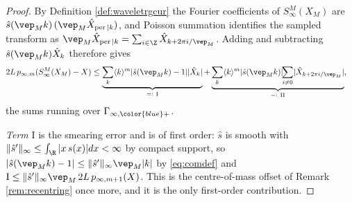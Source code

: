 \documentclass[a4paper, 11pt]{article}
\DeclareMathOperator{\1}{\mathds{1}}
\DeclareMathOperator{\per}{per}
\begin{document}
\begin{proof}
By Definition \ref{def:waveletrgcur} the Fourier coefficients of $S^{M}_{\infty}(X_{M})$ are $\hat{s}(\vep_{M}k)\!\ (\vep_{M}\hat{X}_{\per|k})$, and Poisson summation identifies the sampled transform as $\vep_{M}\hat{X}_{\per|k} = \sum_{i\in\Z}\hat{X}_{k+2\pi i/\vep_{M}}$. Adding and subtracting $\hat{s}(\vep_{M}k)\hat{X}_{k}$ therefore gives
\begin{align*}
2L\!\ p_{\infty,m}(S^{M}_{\infty}(X_{M})-X) & \leq \underbrace{\sum_{k}\langle k\rangle^{m}|\hat{s}(\vep_{M}k)-1||\hat{X}_{k}|}_{=:\ \mathrm{I}}+\underbrace{\sum_{k}\langle k\rangle^{m}|\hat{s}(\vep_{M}k)|\!\!\sum_{i\neq0}\!|\hat{X}_{k+2\pi i/\vep_{M}}|}_{=:\ \mathrm{II}},
\end{align*}
the sums running over $\Gamma_{\infty,{\color{blue}+}}$.

\emph{Term} $\mathrm{I}$ is the smearing error and is of first order: $\hat{s}$ is smooth with $\|\hat{s}'\|_{\infty}\leq\int_{\R}|x\!\ s(x)|dx<\infty$ by compact support, so $|\hat{s}(\vep_{M}k)-1|\leq\|\hat{s}'\|_{\infty}\vep_{M}|k|$ by \eqref{eq:comdef} and $\mathrm{I}\leq\|\hat{s}'\|_{\infty}\vep_{M}\!\ 2L\!\ p_{\infty,m+1}(X)$. This is the centre-of-mass offset of Remark \ref{rem:recentring} once more, and it is the only first-order contribution.


\end{proof}
\end{document}
